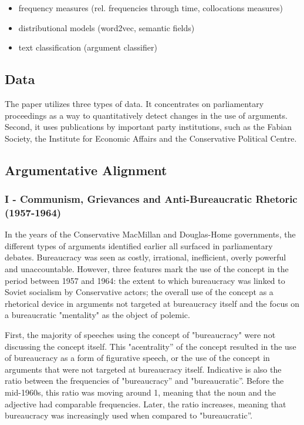\documentclass[
]{article}
\begin{document}
\begin{itemize}
\item
  frequency measures (rel. frequencies through time, collocations
  measures)
\item
  distributional models (word2vec, semantic fields)
\item
  text classification (argument classifier)
\end{itemize}

\hypertarget{header-n27}{%
\subsection{Data}\label{header-n27}}

The paper utilizes three types of data. It concentrates on parliamentary
proceedings as a way to quantitatively detect changes in the use of
arguments. Second, it uses publications by important party institutions,
such as the Fabian Society, the Institute for Economic Affairs and the
Conservative Political Centre.

\hypertarget{header-n30}{%
\subsection{Argumentative Alignment}\label{header-n30}}

\hypertarget{header-n31}{%
\subsubsection{I - Communism, Grievances and Anti-Bureaucratic Rhetoric
(1957-1964)}\label{header-n31}}

In the years of the Conservative MacMillan and Douglas-Home governments,
the different types of arguments identified earlier all surfaced in
parliamentary debates. Bureaucracy was seen as costly, irrational,
inefficient, overly powerful and unaccountable. However, three features
mark the use of the concept in the period between 1957 and 1964: the
extent to which bureaucracy was linked to Soviet socialism by
Conservative actors; the overall use of the concept as a rhetorical
device in arguments not targeted at bureaucracy itself and the focus on
a bureaucratic "mentality" as the object of polemic.

First, the majority of speeches using the concept of "bureaucracy" were
not discussing the concept itself. This "acentrality'' of the concept
resulted in the use of bureaucracy as a form of figurative speech, or
the use of the concept in arguments that were not targeted at
bureaucracy itself. Indicative is also the ratio between the frequencies
of "bureaucracy'' and "bureaucratic''. Before the mid-1960s, this ratio
was moving around 1, meaning that the noun and the adjective had
comparable frequencies. Later, the ratio increases, meaning that
bureaucracy was increasingly used when compared to "bureaucratic''.
\end{document}
